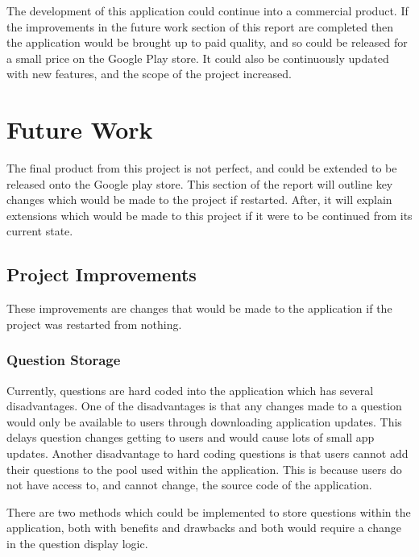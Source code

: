 \documentclass{article}
\begin{document}
The development of this application could continue into a commercial product. If the improvements in the future work section of this report are completed then the application would be brought up to paid quality, and so could be released for a small price on the Google Play store. It could also be continuously updated with new features, and the scope of the project increased. \par

\section{Future Work}
\label{section:futureWork}

The final product from this project is not perfect, and could be extended to be released onto the Google play store. This section of the report will outline key changes which would be made to the project if restarted. After, it will explain extensions which would be made to this project if it were to be continued from its current state. \par

\subsection{Project Improvements}

These improvements are changes that would be made to the application if the project was restarted from nothing.

\subsubsection{Question Storage}

Currently, questions are hard coded into the application which has several disadvantages. One of the disadvantages is that any changes made to a question would only be available to users through downloading application updates. This delays question changes getting to users and would cause lots of small app updates. Another disadvantage to hard coding questions is that users cannot add their questions to the pool used within the application. This is because users do not have access to, and cannot change, the source code of the application. \par

There are two methods which could be implemented to store questions within the application, both with benefits and drawbacks and both would require a change in the question display logic. \par
\end{document}
